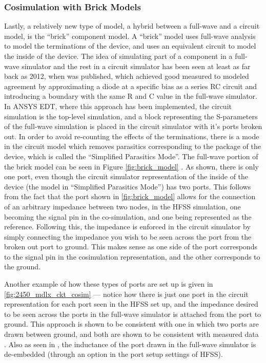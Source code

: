 \documentclass[12pt]{usfcoe}
\begin{document}
    \subsubsection{Cosimulation with Brick Models}
    \label{differential_port_explanation}
    Lastly, a relatively new type of model, a hybrid between a full-wave and a circuit model, is the ``brick'' component model.
    A ``brick'' model uses full-wave analysis to model the terminations of the device, and uses an equivalent circuit to model the inside of the device.
    The idea of simulating part of a component in a full-wave simulator and the rest in a circuit simulator has been seen at least as far back as 2012, when \cite{brick_diode} was published, which achieved good measured to modeled agreement by approximating a  diode at a specific bias as a series RC circuit and introducing a boundary with the same R and C value in the full-wave simulator. 
    In ANSYS EDT, where this approach has been implemented, the circuit simulation is the top-level simulation, and a block representing the S-parameters of the full-wave simulation is placed in the circuit simulator with it's ports broken out.
    In order to avoid re-counting the effects of the terminations, there is a mode in the circuit model which removes parasitics corresponding to the package of the device, which is called the ``Simplified Parasitics Mode''. 
    The full-wave portion of the brick model can be seen in Figure \ref{fig:brick_model} .
    As shown, there is only one port, even though the circuit simulator representation of the inside of the device (the model in ``Simplified Parasitics Mode'') has two ports.
    This follows from the fact that the port shown in \ref{fig:brick_model} allows for the connection of an arbitrary impedance between two nodes, in the HFSS simulation, one becoming the signal pin in the co-simulation, and one being represented as the reference. 
    Following this, the impedance is enforced in the circuit simulator by simply connecting the impedance you wish to be seen across the port from the broken out port to ground. 
    This makes sense as one side of the port corresponds to the signal pin in the cosimulation representation, and the other corresponds to the ground.

    Another example of how these types of ports are set up is given in \ref{fig:2450_mdlx_ckt_cosim} --- notice how there is just one port in the circuit representation for each port seen in the HFSS set up, and the impedance desired to be seen across the ports in the full-wave simulator is attached from the port to ground.
    This approach is shown to be consistent with one in which two ports are drawn between ground, and both are shown to be consistent with measured data \cite{port_wackyness}. 
    Also as seen in \cite{port_wackyness}, the inductance of the port drawn in the full-wave simulator is de-embedded (through an option in the port setup settings of HFSS). 
\end{document}

